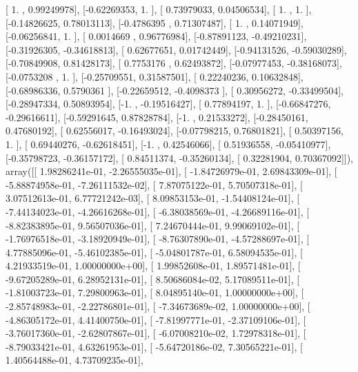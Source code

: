 \documentclass{article}
\begin{document}
       [ 1.        ,  0.99249978],
       [-0.62269353,  1.        ],
       [ 0.73979033,  0.04506534],
       [ 1.        ,  1.        ],
       [-0.14826625,  0.78013113],
       [-0.4786395 ,  0.71307487],
       [ 1.        ,  0.14071949],
       [-0.06256841,  1.        ],
       [ 0.0014669 ,  0.96776984],
       [-0.87891123, -0.49210231],
       [-0.31926305, -0.34618813],
       [ 0.62677651,  0.01742449],
       [-0.94131526, -0.59030289],
       [-0.70849908,  0.81428173],
       [ 0.7753176 ,  0.62493872],
       [-0.07977453, -0.38168073],
       [-0.0753208 ,  1.        ],
       [-0.25709551,  0.31587501],
       [ 0.22240236,  0.10632848],
       [-0.68986336,  0.5790361 ],
       [-0.22659512, -0.4098373 ],
       [ 0.30956272, -0.33499504],
       [-0.28947334,  0.50893954],
       [-1.        , -0.19516427],
       [ 0.77894197,  1.        ],
       [-0.66847276, -0.29616611],
       [-0.59291645,  0.87828784],
       [-1.        ,  0.21533272],
       [-0.28450161,  0.47680192],
       [ 0.62556017, -0.16493024],
       [-0.07798215,  0.76801821],
       [ 0.50397156,  1.        ],
       [ 0.69440276, -0.62618451],
       [-1.        ,  0.42546066],
       [ 0.51936558, -0.05410977],
       [-0.35798723, -0.36157172],
       [ 0.84511374, -0.35260134],
       [ 0.32281904,  0.70367092]]), array([[  1.98286241e-01,  -2.26555035e-01],
       [ -1.84726979e-01,   2.69843309e-01],
       [ -5.88874958e-01,  -7.26111532e-02],
       [  7.87075122e-01,   5.70507318e-01],
       [  3.07512613e-01,   6.77721242e-03],
       [  8.09853153e-01,  -1.54408124e-01],
       [ -7.44134023e-01,  -4.26616268e-01],
       [ -6.38038569e-01,  -4.26689116e-01],
       [ -8.82383895e-01,   9.56507036e-01],
       [  7.24670444e-01,   9.99069102e-01],
       [ -1.76976518e-01,  -3.18920949e-01],
       [ -8.76307890e-01,  -4.57288697e-01],
       [  4.77885096e-01,  -5.46102385e-01],
       [ -5.04801787e-01,   6.58094535e-01],
       [  4.21933519e-01,   1.00000000e+00],
       [  1.99852608e-01,   1.89571481e-01],
       [ -9.67205289e-01,   6.28952131e-01],
       [  8.50686084e-02,   5.17089511e-01],
       [ -1.81003723e-01,   7.29800963e-01],
       [  8.04895140e-01,   1.00000000e+00],
       [ -2.85748983e-01,  -2.22786801e-01],
       [ -7.34673689e-02,   1.00000000e+00],
       [ -4.86305172e-01,   4.41400750e-01],
       [ -7.81997771e-01,  -2.37109106e-01],
       [ -3.76017360e-01,  -2.62807867e-01],
       [ -6.07008210e-02,   1.72978318e-01],
       [ -8.79033421e-01,   4.63261953e-01],
       [ -5.64720186e-02,   7.30565221e-01],
       [  1.40564488e-01,   4.73709235e-01],
\end{document}
